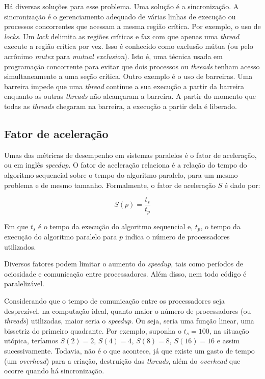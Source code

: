 \documentclass[12pt]{article}
\begin{document}
Há diversas soluções para esse problema. Uma solução é a  sincronização. A sincronização é o gerenciamento adequado de várias linhas de execução ou processos concorrentes que acessam a mesma região crítica. Por exemplo, o uso de \textit{locks}. Um \textit{lock} delimita as regiões críticas e faz com que apenas uma \textit{thread} execute a região crítica por vez. Isso é conhecido como exclusão mútua (ou pelo acrônimo \textit{mutex} para \textit{mutual exclusion}). Isto é, uma técnica usada em programação concorrente para evitar que dois processos ou \textit{threads} tenham acesso simultaneamente a uma seção crítica. Outro exemplo é o uso de barreiras. Uma barreira impede que uma \textit{thread} continue a sua execução a partir da barreira enquanto as outras \textit{threads} não alcançaram a barreira. A partir do momento que todas as \textit{threads} chegaram na barreira, a execução a partir dela é liberado.

\subsection{Fator de aceleração} \label{sec:speedup}

Umas das métricas de desempenho em sistemas paralelos é o fator de aceleração, ou em inglês \textit{speedup}. O fator de aceleração relaciona é a relação do tempo do algoritmo sequencial sobre o tempo do algoritmo paralelo, para um mesmo problema e de mesmo tamanho. Formalmente, o fator de aceleração $S$ é dado por:

$$ S\left(p\right)=\frac{t_s}{t_p}
$$

Em que $t_s$ é o tempo da execução do algoritmo sequencial e, $t_p$, o tempo da execução do algoritmo paralelo para $p$ indica o número de processadores utilizados.

Diversos fatores podem limitar o aumento do \textit{speedup}, tais como períodos de ociosidade e comunicação entre processadores. Além disso, nem todo código é paralelizável.

Considerando que o tempo de comunicação entre os processadores seja desprezível, na computação ideal, quanto maior o número de processadores (ou \textit{threads}) utilizadas, maior seria o \textit{speedup}. Ou seja, seria uma função linear, uma bissetriz do primeiro quadrante. Por exemplo, suponha o $t_s=100$, na situação utópica, teríamos $S\left(2\right)=2$, $S\left(4\right)=4$, $S\left(8\right)=8$, $S\left(16\right)=16$ e assim sucessivamente. Todavia, não é o que acontece, já que existe um gasto de tempo (um \textit{overhead}) para a criação, destruição das \textit{threads}, além do \textit{overhead} que ocorre quando há sincronização.
\end{document}
